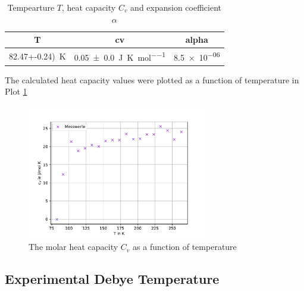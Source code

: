\begin{table}[H]
	\centering
	\caption{Tempearture $T$, heat capacity $C_v$ and expansion coefficient $\alpha$}
	\begin{tabular}{c c c}
	\toprule
	T & cv & alpha\\
	\midrule
	\qty{82.47+-0.24)}{\kelvin}& \qty{0.05+-0.0}{\joule \per \kelvin\per\mol}& \num{8.5e-06} \\
	\bottomrule
	\end{tabular}
	\end{table}

The calculated heat capacity values were plotted as a function of temperature in Plot \ref{fig:heat_capacity_plot}
\begin{figure}[H]
	\centering
	\includegraphics[width=0.7\textwidth]{build/Cv.pdf}
	\caption{The molar heat capacity $C_v$ as a function of temperature}
	\label{fig:heat_capacity_plot}
\end{figure}

\subsection{Experimental Debye Temperature}
\label{sec:experimental_debye_temperature}

